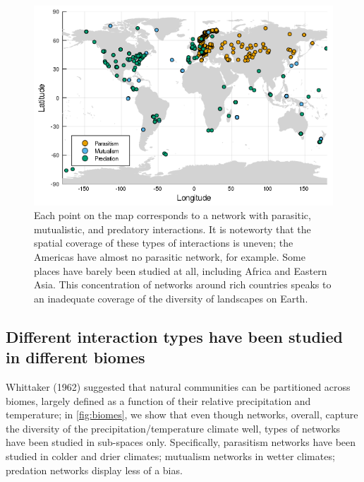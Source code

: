 \begin{figure}
\centering
\includegraphics{figures/figure_01_c.png}
\caption{Each point on the map corresponds to a network with parasitic,
mutualistic, and predatory interactions. It is noteworty that the
spatial coverage of these types of interactions is uneven; the Americas
have almost no parasitic network, for example. Some places have barely
been studied at all, including Africa and Eastern Asia. This
concentration of networks around rich countries speaks to an inadequate
coverage of the diversity of landscapes on Earth.\label{fig:spatial}}
\end{figure}

\hypertarget{different-interaction-types-have-been-studied-in-different-biomes}{%
\subsection{Different interaction types have been studied in different
biomes}\label{different-interaction-types-have-been-studied-in-different-biomes}}

Whittaker (1962) suggested that natural communities can be partitioned
across biomes, largely defined as a function of their relative
precipitation and temperature; in \cref{fig:biomes}, we
show that even though networks, overall, capture the diversity of the
precipitation/temperature climate well, types of networks have been
studied in sub-spaces only. Specifically, parasitism networks have been
studied in colder and drier climates; mutualism networks in wetter
climates; predation networks display less of a bias.

